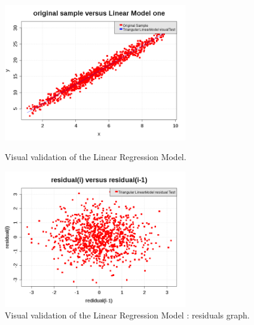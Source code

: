 \begin{figure}[H]
  \begin{minipage}{8cm}
    \begin{center}
      \includegraphics[width=8cm]{linearRegression_Graph.png}
      \caption{Visual validation of the Linear Regression Model.}
      \label{LMGood}
    \end{center}
  \end{minipage}
  \hfill
  \begin{minipage}{8cm}
    \begin{center}
      \includegraphics[width=8cm]{linearRegression_residualGraph.png}
      \caption{Visual validation of the Linear Regression Model : residuals graph.}
      \label{LMResidualGood}
    \end{center}
  \end{minipage}
\end{figure}



